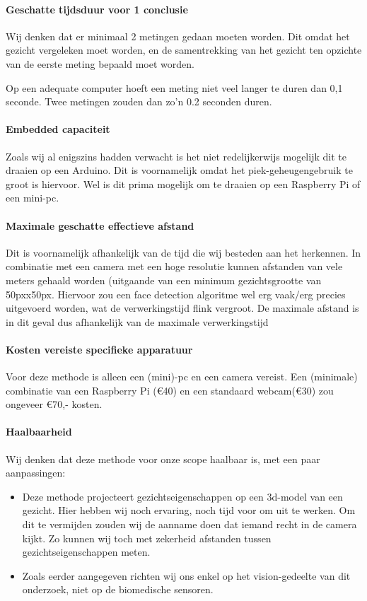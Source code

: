 \documentclass[11pt]{article}
\begin{document}
    \paragraph{Geschatte tijdsduur voor 1 conclusie}
    Wij denken dat er minimaal 2 metingen gedaan moeten worden.
    Dit omdat het gezicht vergeleken moet worden, en de samentrekking van het gezicht ten opzichte van de eerste meting bepaald moet worden.

    Op een adequate computer hoeft een meting niet veel langer te duren dan 0,1 seconde.
    Twee metingen zouden dan zo’n 0.2 seconden duren.

    \paragraph{Embedded capaciteit}
    Zoals wij al enigszins hadden verwacht is het niet redelijkerwijs mogelijk dit te draaien op een Arduino.
    Dit is voornamelijk omdat het piek-geheugengebruik te groot is hiervoor.
    Wel is dit prima mogelijk om te draaien op een Raspberry Pi of een mini-pc.

    \paragraph{Maximale geschatte effectieve afstand}
    Dit is voornamelijk afhankelijk van de tijd die wij besteden aan het herkennen.
    In combinatie met een camera met een hoge resolutie kunnen afstanden van vele meters gehaald worden (uitgaande van een minimum gezichtsgrootte van 50pxx50px.
    Hiervoor zou een face detection algoritme wel erg vaak/erg precies uitgevoerd worden, wat de verwerkingstijd flink vergroot.
    De maximale afstand is in dit geval dus afhankelijk van de maximale verwerkingstijd

    \paragraph{Kosten vereiste specifieke apparatuur}
    Voor deze methode is alleen een (mini)-pc en een camera vereist. Een (minimale) combinatie van een Raspberry Pi (€40) en een standaard webcam(€30) zou ongeveer €70,- kosten.

    \paragraph{Haalbaarheid}
    Wij denken dat deze methode voor onze scope haalbaar is, met een paar aanpassingen:
    \begin{itemize}
        \item Deze methode projecteert gezichtseigenschappen op een 3d-model van een gezicht. Hier hebben wij noch ervaring, noch tijd voor om uit te werken.
        Om dit te vermijden zouden wij de aanname doen dat iemand recht in de camera kijkt.
        Zo kunnen wij toch met zekerheid afstanden tussen gezichtseigenschappen meten.
        \item Zoals eerder aangegeven richten wij ons enkel op het vision-gedeelte van dit onderzoek, niet op de biomedische sensoren.
    \end{itemize}
\end{document}
